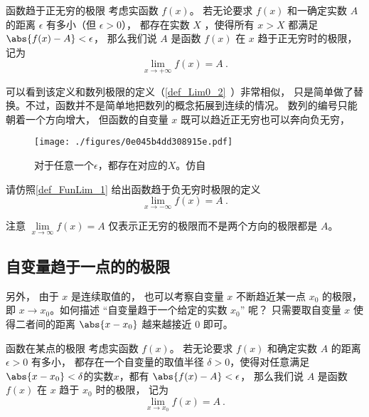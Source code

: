 \begin{definition}{函数趋于正无穷的极限}\label{def_FunLim_1}
考虑实函数 $f(x)$。 若无论要求 $f(x)$ 和一确定实数 $A$ 的距离 $\epsilon$ 有多小（但 $\epsilon>0$）， 都存在实数 $X$ ，使得所有 $x>X$ 都满足 $\abs{f(x)-A}<\epsilon$， 那么我们说 $A$ 是函数 $f(x)$ 在 $x$ 趋于正无穷时的极限， 记为
\begin{equation}
\lim\limits_{x\to +\infty} f(x) = A~.
\end{equation}
\end{definition}

可以看到该定义和数列极限的定义（\autoref{def_Lim0_2}~）非常相似， 只是简单做了替换。不过，函数并不是简单地把数列的概念拓展到连续的情况。 数列的编号只能朝着一个方向增大， 但函数的自变量 $x$ 既可以趋近正无穷也可以奔向负无穷， 

\begin{figure}[ht]
\centering
\texttt{[image: ./figures/0e045b4dd308915e.pdf]}
\caption{对于任意一个$\epsilon$，都存在对应的$X$。仿自\cite{Thomas}} \label{fig_FunLim_5}
\end{figure}

\begin{exercise}{}
请仿照\autoref{def_FunLim_1} 给出函数趋于负无穷时极限的定义
\begin{equation}
\lim\limits_{x\to -\infty} f(x) = A~.
\end{equation}
\end{exercise}

注意 $\lim\limits_{x\to\infty} f(x) = A$ 仅表示正无穷的极限而不是两个方向的极限都是 $A$。

\subsection{自变量趋于一点的的极限}
另外， 由于 $x$ 是连续取值的， 也可以考察自变量 $x$ 不断趋近某一点 $x_0$ 的极限， 即 $x\to x_0$。如何描述 “自变量趋于一个给定的实数 $x_0$” 呢？ 只需要取自变量 $x$ 使得二者间的距离 $\abs{x-x_0}$ 越来越接近 $0$ 即可。

\begin{definition}{函数在某点的极限}\label{def_FunLim_3}
考虑实函数 $f(x)$。 若无论要求 $f(x)$ 和确定实数 $A$ 的距离 $\epsilon>0$ 有多小， 都存在一个自变量的取值半径 $\delta>0$，使得对任意满足 $\abs{x-x_0} < \delta$的实数$x$，都有 $\abs{f(x)-A}<\epsilon$，
那么我们说 $A$ 是函数 $f(x)$ 在 $x$ 趋于 $x_0$ 时的极限， 记为
\begin{equation}
\lim\limits_{x\to x_0}f(x)=A~.
\end{equation}
\end{definition}

